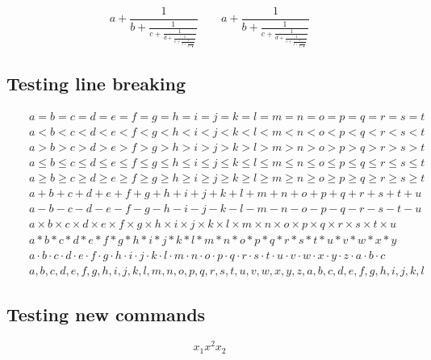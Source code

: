 \[
a + \frac{1}{b + \frac{1}{c + \frac{1}{d + \frac{1}{e + \frac{1}{f + \frac{1}{g + \frac{1}{h}}}}}}} \qquad a + \frac{1}{\displaystyle b + \frac{1}{\displaystyle c + \frac{1}{\displaystyle d + \frac{1}{\displaystyle e + \frac{1}{\displaystyle f + \frac{1}{\displaystyle g + \frac{1}{h}}}}}}}
\]

\subsection{Testing line breaking}

\begin{eqnarray*}
&&a = b = c = d = e = f = g = h = i = j = k = l = m = n = o = p = q = r = s = t\\
&&a < b < c < d < e < f < g < h < i < j < k < l < m < n < o < p < q < r < s < t\\
&&a > b > c > d > e > f > g > h > i > j > k > l > m > n > o > p > q > r > s > t\\
&&a \leq b \leq c \leq d \leq e \leq f \leq g \leq h \leq i \leq j \leq k \leq l \leq m \leq n \leq o \leq p \leq q \leq r \leq s \leq t\\
&&a \geq b \geq c \geq d \geq e \geq f \geq g \geq h \geq i \geq j \geq k \geq l \geq m \geq n \geq o \geq p \geq q \geq r \geq s \geq t\\
&&a + b + c + d + e + f + g + h + i + j + k + l + m + n + o + p + q + r + s + t + u\\
&&a - b - c - d - e - f - g - h - i - j - k - l - m - n - o - p - q - r - s - t - u\\
&&a \times b \times c \times d \times e \times f \times g \times h \times i \times j \times k \times l \times m \times n \times o \times p \times q \times r \times s \times t \times u\\
&&a * b * c * d * e * f * g * h * i * j * k * l * m * n * o * p * q * r * s * t * u * v * w * x * y\\
&&a \cdot b \cdot c \cdot d \cdot e \cdot f \cdot g \cdot h \cdot i \cdot j \cdot k \cdot l \cdot m \cdot n \cdot o \cdot p \cdot q \cdot r \cdot s \cdot t \cdot u \cdot v \cdot w \cdot x \cdot y \cdot z \cdot a \cdot b \cdot c\\
&&a , b , c , d , e , f , g , h , i , j , k , l , m , n , o , p , q , r , s , t , u , v , w , x , y , z , a , b , c , d , e , f, g , h , i , j , k , l
\end{eqnarray*}

\subsection{Testing new commands\label{test}}
\[ 
x_{1} x^{2} x_{2}
\]

